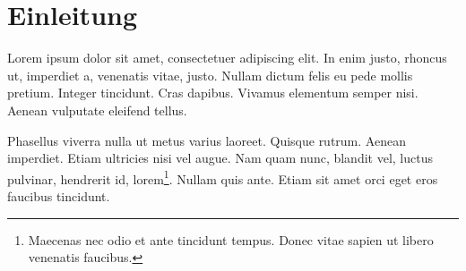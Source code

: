 \section{Einleitung}
Lorem ipsum dolor sit amet, consectetuer adipiscing elit. In enim justo, rhoncus ut, imperdiet a, venenatis vitae, justo. Nullam dictum felis eu pede mollis pretium. Integer tincidunt. Cras dapibus. Vivamus elementum semper nisi. Aenean vulputate eleifend tellus.

Phasellus viverra nulla ut metus varius laoreet. Quisque rutrum. Aenean imperdiet. Etiam ultricies nisi vel augue. Nam quam nunc, blandit vel, luctus pulvinar, hendrerit id, lorem\footnote{Maecenas nec odio et ante tincidunt tempus. Donec vitae sapien ut libero venenatis faucibus.}. Nullam quis ante. Etiam sit amet orci eget eros faucibus tincidunt.